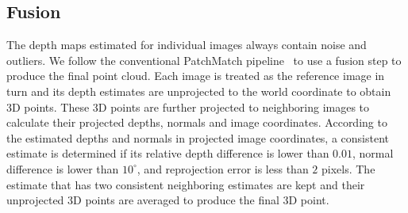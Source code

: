 \documentclass[letterpaper]{article} %
\begin{document}
\subsection{Fusion}

The depth maps estimated for individual images always contain noise and outliers. We follow the conventional PatchMatch pipeline~\cite{Schonberger2016Pixelwise,Xu2018Multi} to use a fusion step to produce the final point cloud. Each image is treated as the reference image in turn and its depth estimates are unprojected to the world coordinate to obtain 3D points. These 3D points are further projected to neighboring images to calculate their projected depths, normals and image coordinates. According to the estimated depths and normals in projected image coordinates, a consistent estimate is determined if its relative depth difference is lower than $0.01$, normal difference is lower than $10^\circ$, and reprojection error is less than $2$ pixels. The estimate that has two consistent neighboring estimates are kept and their unprojected 3D points are averaged to produce the final 3D point.
\end{document}

